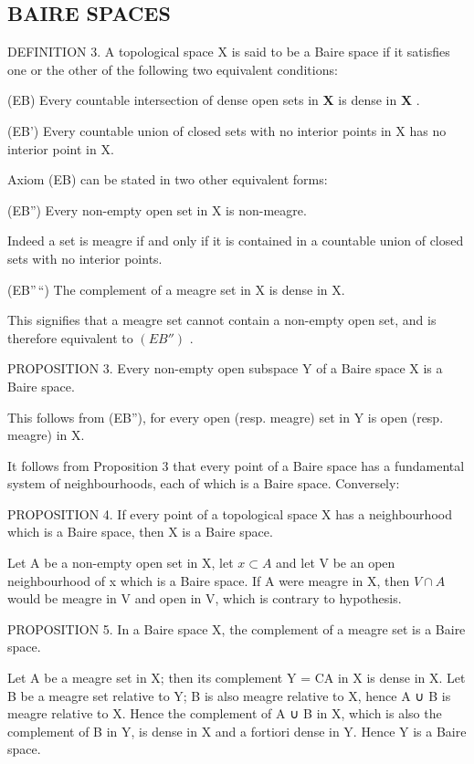 \subsection{BAIRE SPACES}

DEFINITION 3. A topological space X is said to be a Baire space if it satisfies one or the other of the following two equivalent conditions:

(EB) Every countable intersection of dense open sets in \(\mathbf{X}\) is dense in \(\mathbf{X}\) .

(EB') Every countable union of closed sets with no interior points in X has no interior point in X.

Axiom (EB) can be stated in two other equivalent forms:

(EB'') Every non-empty open set in X is non-meagre.

Indeed a set is meagre if and only if it is contained in a countable union of closed sets with no interior points.

(EB''\,``) The complement of a meagre set in X is dense in X.

This signifies that a meagre set cannot contain a non-empty open set, and is therefore equivalent to \((EB'')\) .

PROPOSITION 3. Every non-empty open subspace Y of a Baire space X is a Baire space.

This follows from (EB''), for every open (resp. meagre) set in Y is open (resp. meagre) in X.

It follows from Proposition 3 that every point of a Baire space has a fundamental system of neighbourhoods, each of which is a Baire space. Conversely:

PROPOSITION 4. If every point of a topological space X has a neighbourhood which is a Baire space, then X is a Baire space.

Let A be a non-empty open set in X, let \(x \subset A\) and let V be an open neighbourhood of x which is a Baire space. If A were meagre in X, then \(V \cap A\) would be meagre in V and open in V, which is contrary to hypothesis.

PROPOSITION 5. In a Baire space X, the complement of a meagre set is a Baire space.

Let A be a meagre set in X; then its complement Y = CA in X is dense in X. Let B be a meagre set relative to Y; B is also meagre relative to X, hence A ∪ B is meagre relative to X. Hence the complement of A ∪ B in X, which is also the complement of B in Y, is dense in X and a fortiori dense in Y. Hence Y is a Baire space.

